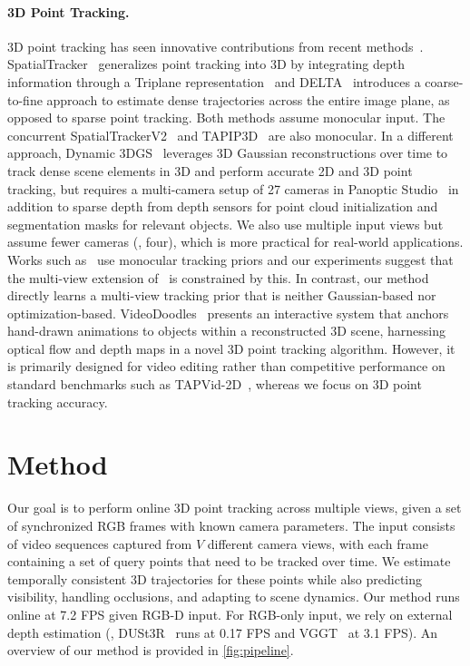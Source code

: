 \documentclass[10pt,twocolumn,letterpaper]{article}
\begin{document}
\paragraph{3D Point Tracking.}
3D point tracking has seen innovative contributions from recent methods~\cite{yu2023videodoodles,luiten2023dynamic,xiao2024spatialtracker,ngo2024delta,xiao2025spatialtrackerv2,tapip3d,som2024}. SpatialTracker~\cite{xiao2024spatialtracker} generalizes point tracking into 3D by integrating depth information through a Triplane representation~\cite{triplane} and DELTA~\cite{ngo2024delta} introduces a coarse-to-fine approach to estimate dense trajectories across the entire image plane, as opposed to sparse point tracking. Both methods assume monocular input. The concurrent SpatialTrackerV2~\cite{xiao2025spatialtrackerv2} and TAPIP3D~\cite{tapip3d} are also monocular. In a different approach, Dynamic 3DGS~\cite{luiten2023dynamic} leverages 3D Gaussian reconstructions over time to track dense scene elements in 3D and perform accurate 2D and 3D point tracking, but requires a multi-camera setup of 27 cameras in Panoptic Studio~\cite{joo2015panoptic} in addition to sparse depth from depth sensors for point cloud initialization and segmentation masks for relevant objects. We also use multiple input views but assume fewer cameras (\eg, four), which is more practical for real-world applications. Works such as~\cite{som2024,dreamscene4d,seidenschwarz2024dynomo} use monocular tracking priors and our experiments suggest that the multi-view extension of~\cite{som2024} is constrained by this. In contrast, our method directly learns a multi-view tracking prior that is neither Gaussian-based nor optimization-based. VideoDoodles~\cite{yu2023videodoodles} presents an interactive system that anchors hand-drawn animations to objects within a reconstructed 3D scene, harnessing optical flow and depth maps in a novel 3D point tracking algorithm. However, it is primarily designed for video editing rather than competitive performance on standard benchmarks such as TAPVid-2D~\cite{doersch2023tapvid}, whereas we focus on 3D point tracking accuracy.

\section{Method}
\label{sec:method}

Our goal is to perform online 3D point tracking across multiple views, given a set of synchronized RGB frames with known camera parameters. The input consists of video sequences captured from $V$ different camera views, with each frame containing a set of query points that need to be tracked over time. We estimate temporally consistent 3D trajectories for these points while also predicting visibility, handling occlusions, and adapting to scene dynamics. Our method runs online at 7.2 FPS given RGB-D input. For RGB-only input, we rely on external depth estimation (\eg, DUSt3R~\cite{wang2024dust3r} runs at 0.17 FPS and VGGT~\cite{wang2025vggt} at 3.1 FPS). An overview of our method is provided in \cref{fig:pipeline}.
\end{document}
